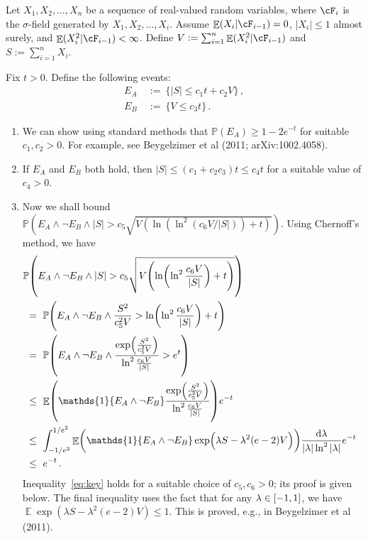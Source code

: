 \documentclass[11pt]{article}
\DeclareMathOperator{\E}{\mathbb{E}}
\renewcommand{\P}{\ensuremath{\mathbb{P}}}
\theoremstyle{remark}
\theoremstyle{definition}
\newcommand\braces[1]{\{#1\}}
\renewcommand\abs[1]{|#1|} %
\newcommand\ind[1]{\ensuremath{\mathds{1}\{#1\}}}
\newcommand\Parens[1]{\mleft(#1\mright)}
\begin{document}
Let $X_1, X_2, \dotsc, X_n$ be a sequence of real-valued random
variables, where $\cF_i$ is the $\sigma$-field generated by $X_1, X_2,
\dotsc, X_i$.
Assume $\E(X_i|\cF_{i-1}) = 0$, $\abs{X_i} \leq 1$ almost surely, and
$\E(X_i^2|\cF_{i-1}) < \infty$.
Define $V := \sum_{i=1}^n \E(X_i^2|\cF_{i-1})$ and $S := \sum_{i=1}^n
X_i$.

Fix $t>0$.
Define the following events:
\begin{align*}
  E_A & \ := \ \braces{ |S| \leq c_1 t + c_2 V }
  \,, \\
  E_B & \ := \ \braces{ V \leq c_3 t }
  \,.
\end{align*}
\begin{enumerate}
  \item
    We can show using standard methods that $\P(E_A) \geq 1-2e^{-t}$
    for suitable $c_1, c_2 > 0$.
    For example, see Beygelzimer et al (2011; arXiv:1002.4058).

  \item
    If $E_A$ and $E_B$ both hold, then $|S| \leq (c_1 + c_2c_3) t \leq
    c_4 t$ for a suitable value of $c_4 > 0$.

  \item
    Now we shall bound $\P(E_A \wedge \neg E_B \wedge |S| > c_5
    \sqrt{V (\ln(\ln^2(c_6V/|S|)) + t)})$.
    Using Chernoff's method, we have
    \begin{align}
      \lefteqn{
        \P\Parens{
          E_A \wedge \neg E_B \wedge
          |S| > c_5 \sqrt{
            V \Parens{
              \ln\Parens{
                \ln^2\frac{c_6V}{|S|}
              } + t
            }
          }
        }
      }
      \notag \\
      & \ = \
      \P\Parens{
        E_A \wedge \neg E_B \wedge
        \frac{S^2}{c_5^2V}
        > \ln\Parens{\ln^2\frac{c_6V}{|S|}} + t
      }
      \notag \\
      & \ = \
      \P\Parens{
        E_A \wedge \neg E_B \wedge
        \frac{
          \exp\Parens{\frac{S^2}{c_5^2V}}
        }{
          \ln^2\frac{c_6V}{|S|}
        }
        > e^t
      }
      \notag \\
      & \ \leq \
      \E\Parens{
        \ind{E_A \wedge \neg E_B}
        \frac{
          \exp\Parens{\frac{S^2}{c_5^2V}}
        }{
          \ln^2\frac{c_6V}{|S|}
        }
      }
      e^{-t}
      \notag \\
      & \ \leq \
      \int_{-1/e^2}^{1/e^2}
      \E\Parens{
        \ind{E_A \wedge \neg E_B}
        \exp\Parens{ \lambda S - \lambda^2 (e-2) V }
      }
      \frac{\dif\lambda}{\abs{\lambda}\ln^2\abs{\lambda}}
      e^{-t}
      \label{eq:key} \\
      & \ \leq \
      e^{-t}
      \,.
    \end{align}
    Inequality~\eqref{eq:key} holds for a suitable choice of
    $c_5, c_6 > 0$; its proof is given below.
    The final inequality uses the fact that for any $\lambda \in
    \intcc{-1,1}$, we have $\E\exp(\lambda S - \lambda^2 (e-2) V) \leq
    1$.
    This is proved, e.g., in Beygelzimer et al (2011).


\end{enumerate}
\end{document}
